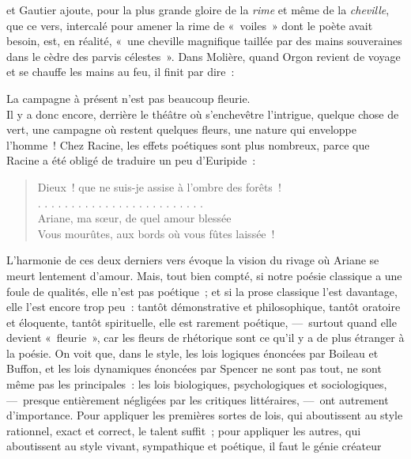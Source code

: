 \documentclass[french,twoside]{book} %
\begin{document}
\noindent et Gautier ajoute, pour la plus grande gloire de la \emph{rime} et même de la \emph{cheville}, que ce vers, intercalé pour amener la rime de « voiles » dont le poète avait besoin, est, en réalité, « une cheville magnifique taillée par des mains souveraines dans le cèdre des parvis célestes ». Dans Molière, quand Orgon revient de voyage et se chauffe les mains au feu, il finit par dire :\par

La campagne à présent n’est pas beaucoup fleurie.\\

\noindent Il y a donc encore, derrière le théâtre où s’enchevêtre l’intrigue, quelque chose de vert, une campagne où restent quelques fleurs, une nature qui enveloppe l’homme ! Chez Racine, les effets poétiques sont plus nombreux, parce que Racine a été obligé de traduire un peu d’Euripide :\par


\begin{verse}
Dieux ! que ne suis-je assise à l’ombre des forêts !\\
. . . . . . . . . . . . . . . . . . . . . . . . .\\
Ariane, ma sœur, de quel amour blessée\\
Vous mourûtes, aux bords où vous fûtes laissée !\\
\end{verse}

\noindent L’harmonie de ces deux derniers vers évoque la vision du rivage où Ariane se meurt lentement d’amour. Mais, tout bien compté, si notre poésie classique a une foule de qualités, elle n’est pas poétique ; et si la prose classique l’est davantage, elle l’est encore trop peu : tantôt démonstrative et philosophique, tantôt oratoire et éloquente, tantôt spirituelle, elle est rarement poétique, — surtout quand elle devient « fleurie », car les fleurs de rhétorique sont ce qu’il y a de plus étranger à la poésie. On voit que, dans le style, les lois logiques énoncées par Boileau et Buffon, et les lois dynamiques énoncées par Spencer ne sont pas tout, ne sont même pas les principales : les lois biologiques, psychologiques et sociologiques, — presque entièrement négligées par les critiques littéraires, — ont autrement d’importance. Pour appliquer les premières sortes de lois, qui aboutissent au style rationnel, exact et correct, le talent suffit ; pour appliquer les autres, qui aboutissent au style vivant, sympathique et poétique, il faut le génie créateur
\end{document}
